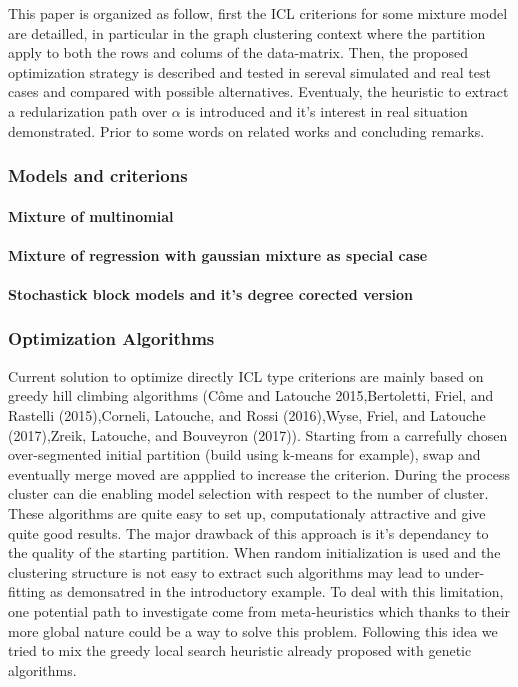 \documentclass[]{article}
\let\oldparagraph\paragraph
\renewcommand{\paragraph}[1]{\oldparagraph{#1}\mbox{}}
\begin{document}
This paper is organized as follow, first the ICL criterions for some
mixture model are detailled, in particular in the graph clustering
context where the partition apply to both the rows and colums of the
data-matrix. Then, the proposed optimization strategy is described and
tested in sereval simulated and real test cases and compared with
possible alternatives. Eventualy, the heuristic to extract a
redularization path over \(\alpha\) is introduced and it's interest in
real situation demonstrated. Prior to some words on related works and
concluding remarks.

\subsubsection{Models and criterions}\label{models-and-criterions}

\paragraph{Mixture of multinomial}\label{mixture-of-multinomial}

\paragraph{Mixture of regression with gaussian mixture as special
case}\label{mixture-of-regression-with-gaussian-mixture-as-special-case}

\paragraph{Stochastick block models and it's degree corected
version}\label{stochastick-block-models-and-its-degree-corected-version}

\subsubsection{Optimization Algorithms}\label{optimization-algorithms}

Current solution to optimize directly ICL type criterions are mainly
based on greedy hill climbing algorithms (Côme and Latouche
2015,Bertoletti, Friel, and Rastelli (2015),Corneli, Latouche, and Rossi
(2016),Wyse, Friel, and Latouche (2017),Zreik, Latouche, and Bouveyron
(2017)). Starting from a carrefully chosen over-segmented initial
partition (build using k-means for example), swap and eventually merge
moved are appplied to increase the criterion. During the process cluster
can die enabling model selection with respect to the number of cluster.
These algorithms are quite easy to set up, computationaly attractive and
give quite good results. The major drawback of this approach is it's
dependancy to the quality of the starting partition. When random
initialization is used and the clustering structure is not easy to
extract such algorithms may lead to under-fitting as demonsatred in the
introductory example. To deal with this limitation, one potential path
to investigate come from meta-heuristics which thanks to their more
global nature could be a way to solve this problem. Following this idea
we tried to mix the greedy local search heuristic already proposed with
genetic algorithms.
\end{document}
